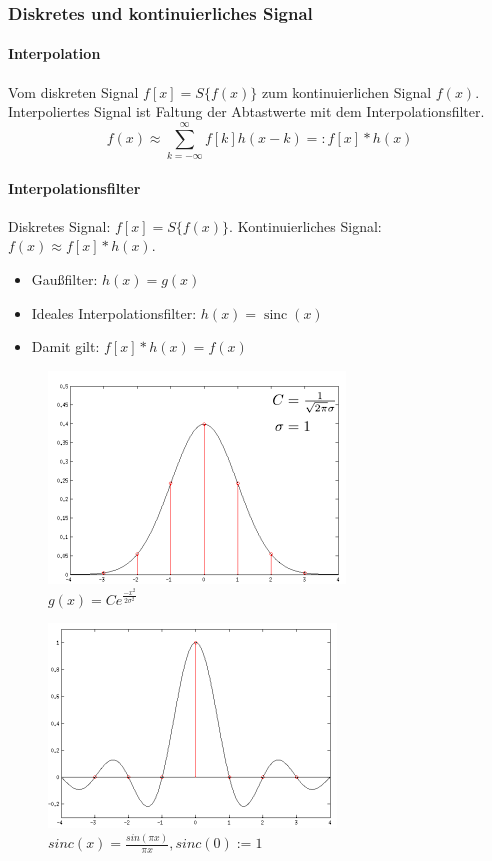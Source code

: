 \documentclass[12pt, a4paper, oneside]{article}
\begin{document}
\subsubsection{Diskretes und kontinuierliches Signal}
\paragraph*{Interpolation}
Vom diskreten Signal $f[x]=S\{f(x)\}$ zum kontinuierlichen Signal $f(x)$. Interpoliertes Signal ist Faltung der Abtastwerte mit dem Interpolationsfilter.
$$
    f(x)\approx \sum_{k=-\infty}^{\infty}f[k]h(x-k)=:f[x]*h(x)
$$

\paragraph*{Interpolationsfilter}
Diskretes Signal: $f[x]=S\{f(x)\}$. Kontinuierliches Signal: $f(x)\approx f[x]*h(x)$.
\begin{itemize}
    \item Gaußfilter: $h(x)=g(x)$
    \item Ideales Interpolationsfilter: $h(x)=\operatorname{sinc}(x)$
    \item Damit gilt: $f[x]*h(x)=f(x)$
\end{itemize}

\begin{figure}[htbp]
    \centering
    \includegraphics[scale=1]{../img/1-6.png}
    \caption{$g(x)=Ce^{\frac{-x^2}{2\sigma^2}}$}
    \label{img/1-6}
\end{figure}
\begin{figure}[htbp]
    \centering
    \includegraphics[scale=1]{../img/1-7.png}
    \caption{$sinc(x)=\frac{sin(\pi x)}{\pi x}, sinc(0):=1$}
    \label{img/1-7}
\end{figure}
\end{document}
